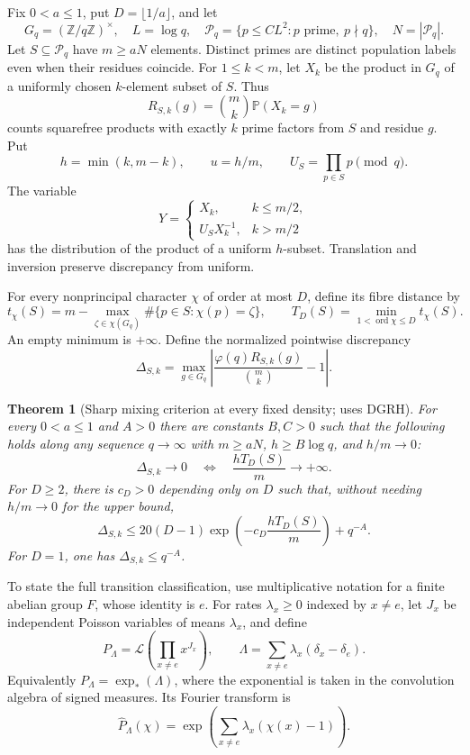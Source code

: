 \documentclass[11pt]{article}
\newtheorem{theorem}{Theorem}[section]
\theoremstyle{remark}\newtheorem{remark}[theorem]{Remark}
\newcommand{\Pp}{\mathbb P}
\newcommand{\Z}{\mathbb Z}
\newcommand{\abs}[1]{\left|#1\right|}
\DeclareMathOperator{\ord}{ord}
\begin{document}
Fix $0<a\le1$, put $D=\lfloor1/a\rfloor$, and let
\[
 G_q=(\Z/q\Z)^\times,\quad L=\log q,\quad
 \mathcal P_q=\{p\le CL^2:p\text{ prime},\ p\nmid q\},\quad N=|\mathcal P_q|.
\]
Let $S\subseteq\mathcal P_q$ have $m\ge aN$ elements. Distinct primes are distinct population labels even when their residues coincide. For $1\le k<m$, let $X_k$ be the product in $G_q$ of a uniformly chosen $k$-element subset of $S$. Thus
\[
 R_{S,k}(g)=\binom mk\Pp(X_k=g)
\]
counts squarefree products with exactly $k$ prime factors from $S$ and residue $g$. Put
\[
 h=\min(k,m-k),\qquad u=h/m,\qquad U_S=\prod_{p\in S}p\pmod q.
\]
The variable
\begin{equation}\label{eq:Y}
 Y=\begin{cases}X_k,&k\le m/2,\\ U_SX_k^{-1},&k>m/2\end{cases}
\end{equation}
has the distribution of the product of a uniform $h$-subset. Translation and inversion preserve discrepancy from uniform.

For every nonprincipal character $\chi$ of order at most $D$, define its fibre distance by
\[
 t_\chi(S)=m-\max_{\zeta\in\chi(G_q)}\#\{p\in S:\chi(p)=\zeta\},\qquad
 T_D(S)=\min_{1<\ord\chi\le D}t_\chi(S).
\]
An empty minimum is $+\infty$. Define the normalized pointwise discrepancy
\[
 \Delta_{S,k}=\max_{g\in G_q}\abs{\frac{\varphi(q)R_{S,k}(g)}{\binom mk}-1}.
\]

\begin{theorem}[Sharp mixing criterion at every fixed density; uses DGRH]\label{thm:criterion}
For every $0<a\le1$ and $A>0$ there are constants $B,C>0$ such that the following holds along any sequence $q\to\infty$ with $m\ge aN$, $h\ge B\log q$, and $h/m\to0$:
\begin{equation}\label{eq:iff}
 \Delta_{S,k}\longrightarrow0
 \quad\Longleftrightarrow\quad
 \frac{hT_D(S)}m\longrightarrow+\infty.
\end{equation}
For $D\ge2$, there is $c_D>0$ depending only on $D$ such that, without needing $h/m\to0$ for the upper bound,
\begin{equation}\label{eq:upper}
 \Delta_{S,k}\le20(D-1)\exp\left(-c_D\frac{hT_D(S)}m\right)+q^{-A}.
\end{equation}
For $D=1$, one has $\Delta_{S,k}\le q^{-A}$.
\end{theorem}

To state the full transition classification, use multiplicative notation for a finite abelian group $F$, whose identity is $e$. For rates $\lambda_x\ge0$ indexed by $x\ne e$, let $J_x$ be independent Poisson variables of means $\lambda_x$, and define
\begin{equation}\label{eq:CP}
 P_\Lambda=\mathcal L\left(\prod_{x\ne e}x^{J_x}\right),\qquad
 \Lambda=\sum_{x\ne e}\lambda_x(\delta_x-\delta_e).
\end{equation}
Equivalently $P_\Lambda=\exp_*(\Lambda)$, where the exponential is taken in the convolution algebra of signed measures. Its Fourier transform is
\begin{equation}\label{eq:CPfourier}
 \widehat P_\Lambda(\chi)
 =\exp\left(\sum_{x\ne e}\lambda_x(\chi(x)-1)\right).
\end{equation}
\end{document}
